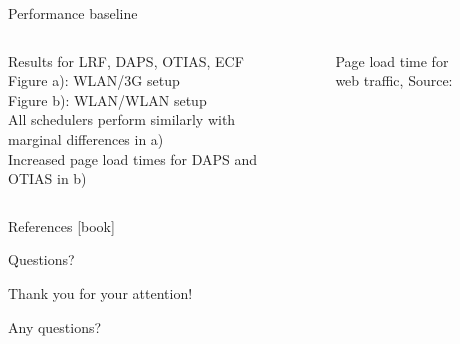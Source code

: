 \documentclass{beamer}
\begin{document}
\begin{frame}{Performance baseline}
  \begin{columns}
    \vspace{-2cm}
    \begin{column}{0.38\textwidth}
      \small
      \bull{} Results for LRF, DAPS, OTIAS, ECF\\
      \vspace{0.3cm}
      \bull{} Figure a): WLAN/3G setup \\
      \vspace{0.3cm}
      \bull{} Figure b): WLAN/WLAN setup\\
      \vspace{0.3cm}
      \bull{} All schedulers perform similarly with marginal differences in a)\\
      \vspace{0.3cm}
      \bull{} Increased page load times for DAPS and OTIAS in b)\\
    \end{column}
    \begin{column}{0.58\textwidth}
      \vspace{-0.8cm}
      \begin{figure}
        \centering
        \vspace{-0.2cm}
        \caption{\footnotesize Page load time for web traffic, \textcolor{uos-grey-full}{Source: {\cite{lowlatschedulers}}}}
      \end{figure}
    \end{column}
  \end{columns}
\end{frame}


\appendix
\begin{frame}[allowframebreaks]{References}
  \small
  [book]
  {}
  
\end{frame}

\begin{frame}{Questions?}
  \begin{center}
    Thank you for your attention!

    Any questions?
  \end{center}
\end{frame}
\end{document}
